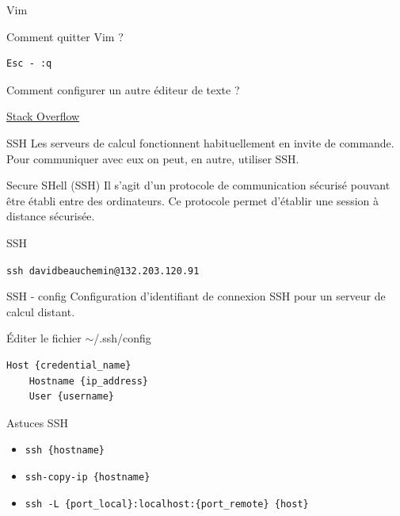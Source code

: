\documentclass[11pt]{beamer}
\begin{document}
\begin{frame}[fragile]{Vim}
\begin{block}{Comment quitter Vim ?}
\begin{lstlisting}
Esc - :q
\end{lstlisting}
\end{block}
Comment configurer un autre éditeur de texte ?
\newline
\begin{center}
\href{https://stackoverflow.com/questions/2596805/how-do-i-make-git-use-the-editor-of-my-choice-for-commits}{Stack Overflow
}
\end{center}
\end{frame}

\begin{frame}[fragile]{SSH}
	Les serveurs de calcul fonctionnent habituellement en invite de commande. Pour communiquer avec eux on peut, en autre, utiliser SSH.
	
	\begin{block}{Secure SHell (SSH)}
		Il s'agit d'un protocole de communication sécurisé pouvant être établi entre des ordinateurs. Ce protocole permet d'établir une session à distance sécurisée.
	\end{block}
\end{frame}

\begin{frame}[fragile]{SSH}
	\begin{block}{}
		\verb|ssh davidbeauchemin@132.203.120.91|
	\end{block}
\end{frame}

\begin{frame}[fragile]{SSH - config}
Configuration d'identifiant de connexion SSH pour un serveur de calcul distant.
\bigskip

\begin{block}{Éditer le fichier  $\sim$/.ssh/config}
\begin{lstlisting}
Host {credential_name}
	Hostname {ip_address}
	User {username}
\end{lstlisting}
\end{block}
\end{frame}

\begin{frame}[fragile]{Astuces SSH}
	\begin{itemize}[<+->]
		\item \verb|ssh {hostname}|
		\item \verb|ssh-copy-ip {hostname}|
		\item \verb|ssh -L {port_local}:localhost:{port_remote} {host}| 
	\end{itemize}
\end{frame}
\end{document}
